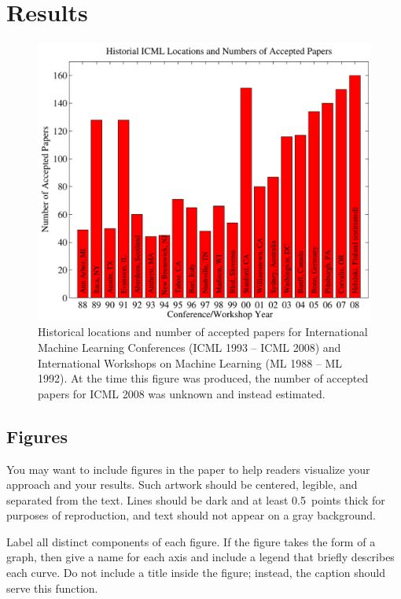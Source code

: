 \documentclass{article}
\begin{document}
\section{Results}


\begin{figure}[ht]
\vskip 0.2in
\begin{center}
\centerline{\includegraphics[width=\columnwidth]{icml_numpapers}}
\caption{Historical locations and number of accepted papers for International
  Machine Learning Conferences (ICML 1993 -- ICML 2008) and
  International Workshops on Machine Learning (ML 1988 -- ML
  1992). At the time this figure was produced, the number of
  accepted papers for ICML 2008 was unknown and instead estimated.}
\label{icml-historical}
\end{center}
\vskip -0.2in
\end{figure} 

\subsection{Figures}
 
You may want to include figures in the paper to help readers visualize
your approach and your results. Such artwork should be centered,
legible, and separated from the text. Lines should be dark and at
least 0.5~points thick for purposes of reproduction, and text should
not appear on a gray background.

Label all distinct components of each figure. If the figure takes the
form of a graph, then give a name for each axis and include a legend
that briefly describes each curve. Do not include a title inside the
figure; instead, the caption should serve this function.
\end{document}
